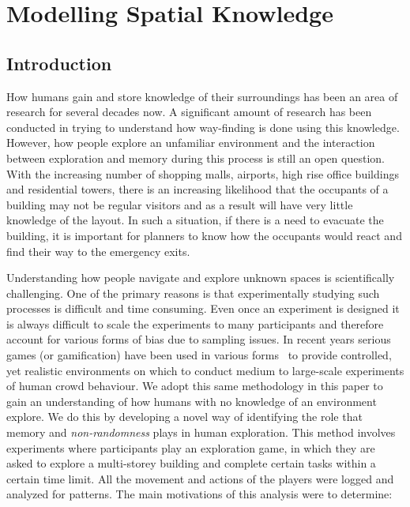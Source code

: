 
\chapter{Modelling Spatial Knowledge}
\label{chapter:SpatialKnowledgeChapter}

\section{Introduction}
\label{intro}

How humans gain and store knowledge of their surroundings has been an area of research for several decades now. A significant amount of research has been conducted in trying to understand how way-finding is done using this knowledge. However, how people explore an unfamiliar environment and the interaction between exploration and memory during this process is still an open question. With the increasing number of shopping malls, airports, high rise office buildings and residential towers, there is an increasing likelihood that the occupants of a building may not be regular visitors and as a result will have very little knowledge of the layout. In such a situation, if there is a need to evacuate the building, it is important for planners to know how the occupants would react and find their way to the emergency exits.

Understanding how people navigate and explore unknown spaces is scientifically challenging. One of the primary reasons is that experimentally studying such processes  is difficult and time consuming. Even once an experiment is designed it is always difficult to scale the experiments to many participants and therefore account for various forms of bias due to sampling issues. In recent years serious games (or gamification) have been used in various forms~\cite{npelechano:2008ug, Anonymous:2011ba, Bode06022014} to  provide controlled, yet realistic environments on which to conduct medium to large-scale experiments of human crowd behaviour. We adopt this same methodology in this paper to gain an understanding of how humans with no knowledge of an environment explore. We do this by developing a novel way of identifying the role that memory and {\em non-randomness} plays in human exploration. This method involves experiments where participants play an exploration game, in which they are asked to explore a multi-storey building and complete certain tasks within a certain time limit. All the movement and actions of the players were logged and analyzed for patterns. The main motivations of this analysis were to determine:

